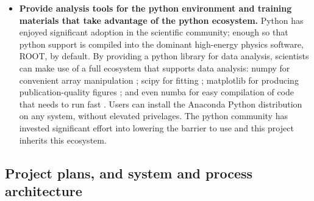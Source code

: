 \begin{itemize}
    \item \textbf{Provide analysis tools for the python environment and training materials that take advantage of the python ecosystem.}  Python has enjoyed significant adoption in the scientific community; enough so that python support is compiled into the dominant high-energy physics software, ROOT, by default.  By providing a python library for data analysis, scientists can make use of a full ecosystem that supports data analysis: numpy for convenient array manipulation \cite{numpy}; scipy for fitting \cite{scipy}; matplotlib for producing publication-quality figures \cite{matplotlib}; and even numba for easy compilation of code that needs to run fast \cite{numba}.  Users can install the Anaconda Python distribution on any system, without elevated privelages.  The python community has invested significant effort into lowering the barrier to use and this project inherits this ecosystem.  %
    
\end{itemize}

\subsection{Project plans, and system and process architecture}


